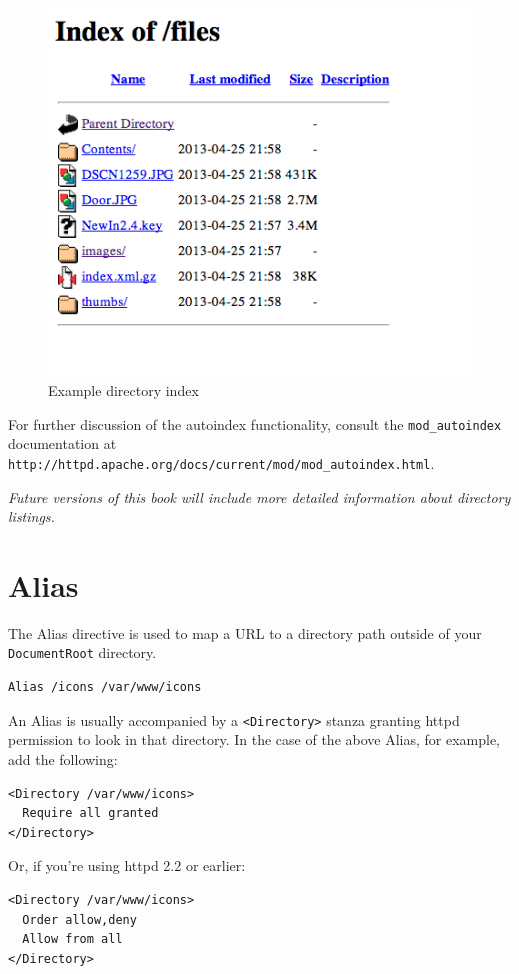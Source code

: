 \begin{figure}[tbph]
\centering
\includegraphics[width=0.7\linewidth]{./figures/autoindex1.png}
\caption{Example directory index}
\label{fig:autoindex1}
\end{figure}

For further discussion of the autoindex functionality, consult the \verb~mod_autoindex~ documentation at \verb~http://httpd.apache.org/docs/current/mod/mod_autoindex.html~.

\textit{Future versions of this book will include more detailed information about directory listings.}

\section{Alias}
\label{alias}

The Alias directive is used to map a URL to a directory path outside of your \verb~DocumentRoot~ directory.

\begin{verbatim}
Alias /icons /var/www/icons
\end{verbatim}

An Alias is usually accompanied by a \verb~<Directory>~ stanza granting httpd permission to look in that directory. In the case of the above Alias, for example, add the following:

\begin{verbatim}
<Directory /var/www/icons>
  Require all granted
</Directory>
\end{verbatim}

Or, if you're using httpd 2.2 or earlier:

\begin{verbatim}
<Directory /var/www/icons>
  Order allow,deny
  Allow from all
</Directory>
\end{verbatim}

